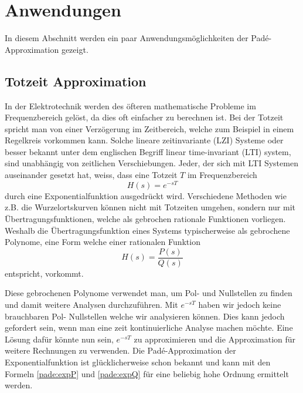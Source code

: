 %
%
%
\section{Anwendungen
\label{pade:section:Anwendungen}}

In diesem Abschnitt werden ein paar Anwendungsmöglichkeiten der Padé-Approximation gezeigt.



\subsection{Totzeit Approximation
\label{pade:subsection:totzeit}}

In der Elektrotechnik werden des öfteren mathematische Probleme im Frequenzbereich gelöst, da dies oft einfacher zu berechnen ist.
Bei der Totzeit spricht man von einer Verzögerung im Zeitbereich, welche zum Beispiel in einem Regelkreis vorkommen kann.
Solche lineare zeitinvariante (LZI) Systeme oder besser bekannt unter dem englischen Begriff linear time-invariant (LTI) system, sind unabhängig von zeitlichen Verschiebungen. 
Jeder, der sich mit LTI Systemen auseinander gesetzt hat, weiss, dass eine Totzeit $T$ im Frequenzbereich
\begin{equation*}
H(s) = e^{-sT}
\end{equation*}
durch eine Exponentialfunktion ausgedrückt wird.
Verschiedene Methoden wie z.B. die Wurzelortskurven können nicht mit Totzeiten umgehen, sondern nur mit Übertragungsfunktionen, welche als gebrochen rationale Funktionen vorliegen.
Weshalb die Übertragungsfunktion eines Systems typischerweise als gebrochene Polynome, eine Form welche einer rationalen Funktion
\begin{equation*}
H(s)=\frac{P(s)}{Q(s)}
\end{equation*}
entspricht, vorkommt.

Diese gebrochenen Polynome verwendet man, um Pol- und Nullstellen zu finden und damit weitere Analysen durchzuführen. 
Mit $e^{-sT}$ haben wir jedoch keine brauchbaren Pol- Nullstellen welche wir analysieren können.
Dies kann jedoch gefordert sein, wenn man eine zeit kontinuierliche Analyse machen möchte.
Eine Lösung dafür könnte nun sein, $e^{-sT}$ zu approximieren und die Approximation für weitere Rechnungen zu verwenden.
Die Padé-Approximation der Exponentialfunktion ist glücklicherweise schon bekannt und kann mit den Formeln \eqref{pade:expP} und \eqref{pade:expQ} für eine beliebig hohe Ordnung ermittelt werden.

